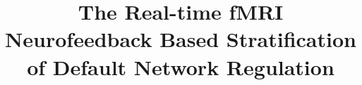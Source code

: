 
\title{The Real-time fMRI Neurofeedback Based Stratification of Default Network Regulation}


\author[addressref={aff1}]{ }
\author[addressref={aff1}]{ }
\author[addressref={aff1,aff2}]{ }
\author[addressref={aff2}]{ }
\author[addressref={aff1}]{ }
\author[addressref={aff2}]{ }
\author[addressref={aff4,aff5}]{ }
\author[addressref={aff2}]{ }
\author[addressref={aff1,aff8}]{ }
\author[addressref={aff1}]{ }
\author[addressref={aff6,aff10,aff11}]{ }
\author[addressref={aff1,aff2}]{ }
\author[addressref={aff1,aff2},
   email={ccraddock@nki.rfmh.org},
   corref={aff1,aff2}]{ }


